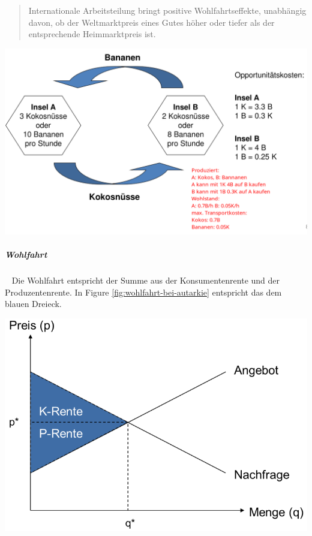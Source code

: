 \documentclass[11pt,twoside,landscape]{article}
\begin{document}
\begin{multicols}{3}
\begin{quote}
Internationale Arbeitsteilung bringt positive Wohlfahrtseffekte, unabhängig
davon, ob der Weltmarktpreis eines Gutes höher oder tiefer als der
entsprechende Heimmarktpreis ist.
\end{quote}

{
\begin{center}
\includegraphics[width=.9\linewidth]{img/komparativen_kostenvorteils.png}
\end{center}
\label{fig:komparativen-kostenvorteil}
}

\subparagraph{Wohlfahrt} \
\label{sec:orgbf0b69b}
Die Wohlfahrt entspricht der Summe aus der Konsumentenrente und der Produzentenrente.
In Figure \ref{fig:wohlfahrt-bei-autarkie} entspricht das dem blauen Dreieck.

{
\begin{center}
\includegraphics[width=.9\linewidth]{img/wohlfahrt_bei_autarkie.png}
\end{center}
\label{fig:wohlfahrt-bei-autarkie}
}


\end{multicols}
\end{document}
